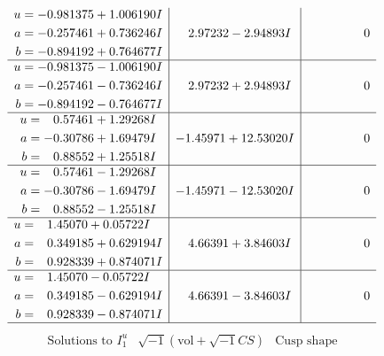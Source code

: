 \documentclass[1p]{elsarticle_modified}
\theoremstyle{definition}
\newcommand{\I}{\sqrt{-1}}
\begin{document}
$$\begin{array}{c|c|c}
\begin{aligned}
u &= -0.981375 + 1.006190 I \\
a &= -0.257461 + 0.736246 I \\
b &= -0.894192 + 0.764677 I\end{aligned}
 & \phantom{-}2.97232 - 2.94893 I & \phantom{-0.000000 } 0 \\ \hline\begin{aligned}
u &= -0.981375 - 1.006190 I \\
a &= -0.257461 - 0.736246 I \\
b &= -0.894192 - 0.764677 I\end{aligned}
 & \phantom{-}2.97232 + 2.94893 I & \phantom{-0.000000 } 0 \\ \hline\begin{aligned}
u &= \phantom{-}0.57461 + 1.29268 I \\
a &= -0.30786 + 1.69479 I \\
b &= \phantom{-}0.88552 + 1.25518 I\end{aligned}
 & -1.45971 + 12.53020 I & \phantom{-0.000000 } 0 \\ \hline\begin{aligned}
u &= \phantom{-}0.57461 - 1.29268 I \\
a &= -0.30786 - 1.69479 I \\
b &= \phantom{-}0.88552 - 1.25518 I\end{aligned}
 & -1.45971 - 12.53020 I & \phantom{-0.000000 } 0 \\ \hline\begin{aligned}
u &= \phantom{-}1.45070 + 0.05722 I \\
a &= \phantom{-}0.349185 + 0.629194 I \\
b &= \phantom{-}0.928339 + 0.874071 I\end{aligned}
 & \phantom{-}4.66391 + 3.84603 I & \phantom{-0.000000 } 0 \\ \hline\begin{aligned}
u &= \phantom{-}1.45070 - 0.05722 I \\
a &= \phantom{-}0.349185 - 0.629194 I \\
b &= \phantom{-}0.928339 - 0.874071 I\end{aligned}
 & \phantom{-}4.66391 - 3.84603 I & \phantom{-0.000000 } 0\\
 \hline 
 \end{array}$$\newpage$$\begin{array}{c|c|c}  
\text{Solutions to }I^u_{1}& \I (\text{vol} + \sqrt{-1}CS) & \text{Cusp shape}\\
 \hline 
\begin{aligned}

\end{aligned}
\end{array}$$
\end{document}
